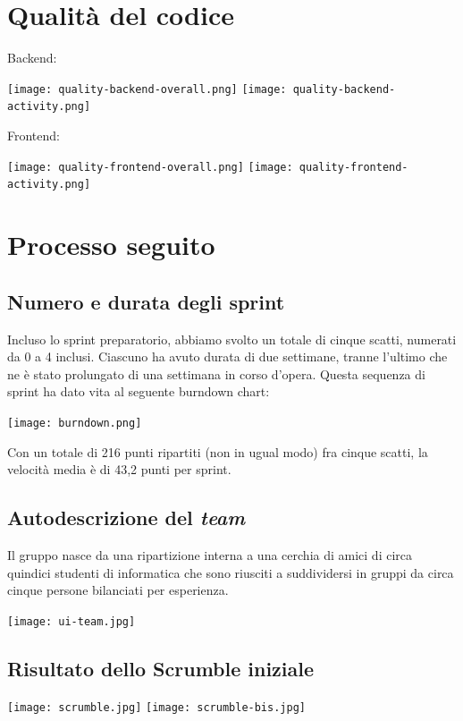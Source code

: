 \documentclass{article}
\begin{document}
\section{Qualità del codice}

Backend:

\texttt{[image: quality-backend-overall.png]}
\texttt{[image: quality-backend-activity.png]}

Frontend:

\texttt{[image: quality-frontend-overall.png]}
\texttt{[image: quality-frontend-activity.png]}

\section{Processo seguito}

\subsection{Numero e durata degli sprint}

Incluso lo sprint preparatorio, abbiamo svolto un totale di cinque scatti,
numerati da 0 a 4 inclusi. Ciascuno ha avuto durata di due settimane, tranne
l'ultimo che ne è stato prolungato di una settimana in corso d'opera. Questa
sequenza di sprint ha dato vita al seguente burndown chart:

\texttt{[image: burndown.png]}

Con un totale di 216 punti ripartiti (non in ugual modo) fra cinque scatti, la
velocità media è di 43,2 punti per sprint.

\subsection{Autodescrizione del \emph{team}}

Il gruppo nasce da una ripartizione interna a una cerchia di amici di circa
quindici studenti di informatica che sono riusciti a suddividersi in gruppi da
circa cinque persone bilanciati per esperienza.

\texttt{[image: ui-team.jpg]}

\subsection{Risultato dello Scrumble iniziale}

\texttt{[image: scrumble.jpg]}
\texttt{[image: scrumble-bis.jpg]}
\end{document}
